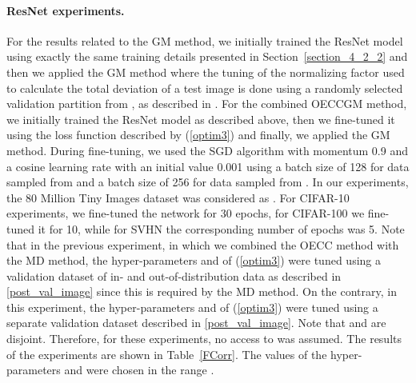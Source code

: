 \documentclass{article} \usepackage{iclr2020_conference,times}
\begin{document}
\paragraph{ResNet experiments.}For the results related to the GM method, we initially trained the ResNet model using exactly the same training details presented in Section~\ref{section_4_2_2} and then we applied the GM method where the tuning of the normalizing factor used to calculate the total deviation of a test image is done using a randomly selected validation partition from , as described in \citet{ch2019detecting}. For the combined OECCGM method, we initially trained the ResNet model as described above, then we fine-tuned it using the loss function described by (\ref{optim3}) and finally, we applied the GM method. During fine-tuning, we used the SGD algorithm with momentum 0.9 and a cosine learning rate \citep{loshchilov-ICLR17SGDR} with an initial value 0.001 using a batch size of 128 for data sampled from  and a batch size of 256 for data sampled from . In our experiments, the 80 Million Tiny Images dataset \citep{Torralba:2008:MTI:1444381.1444403} was considered as . For CIFAR-10 experiments, we fine-tuned the network for 30 epochs, for CIFAR-100 we fine-tuned it for 10, while for SVHN the corresponding number of epochs was 5. Note that in the previous experiment, in which we combined the OECC method with the MD method, the hyper-parameters  and  of (\ref{optim3}) were tuned using a validation dataset of in- and out-of-distribution data as described in \ref{post_val_image} since this is required by the MD method. On the contrary, in this experiment, the hyper-parameters  and  of (\ref{optim3}) were tuned using a separate validation dataset  described in \ref{post_val_image}. Note that  and  are disjoint. Therefore, for these experiments, no access to  was assumed. The results of the experiments are shown in Table~\ref{FCorr}. The values of the hyper-parameters  and  were chosen in the range .
\end{document}
